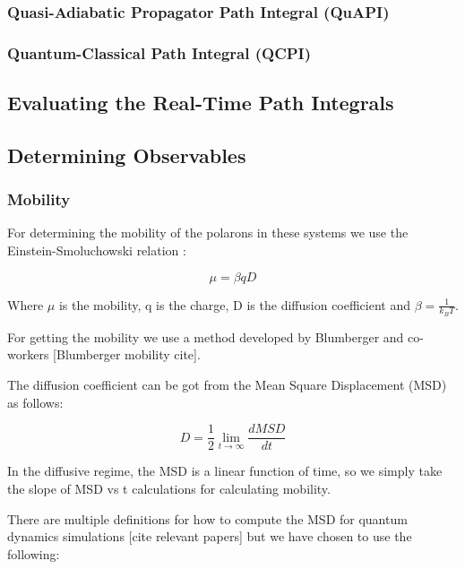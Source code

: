\subsubsection{Quasi-Adiabatic Propagator Path Integral (QuAPI)}






\subsubsection{Quantum-Classical Path Integral (QCPI)}

\subsection{Evaluating the Real-Time Path Integrals}

\subsection{Determining Observables}

\subsubsection{Mobility}

For determining the mobility of the polarons in these systems we use the Einstein-Smoluchowski relation : 

\begin{equation}
    \mu = \beta qD
\end{equation}

Where $\mu$ is the mobility, q is the charge, D is the diffusion coefficient and $\beta = \frac{1}{k_B T}$. 

For getting the mobility we use a method developed by Blumberger and co-workers [Blumberger mobility cite]. 

The diffusion coefficient can be got from the Mean Square Displacement (MSD) as follows: 

\begin{equation}
D = \frac{1}{2} \lim_{t \to \infty} \frac{dMSD}{dt}
\end{equation}

In the diffusive regime, the MSD is a linear function of time, so we simply take the slope of MSD vs t calculations for calculating mobility.

There are multiple definitions for how to compute the MSD for quantum dynamics simulations [cite relevant papers] but we have chosen to use the following:

